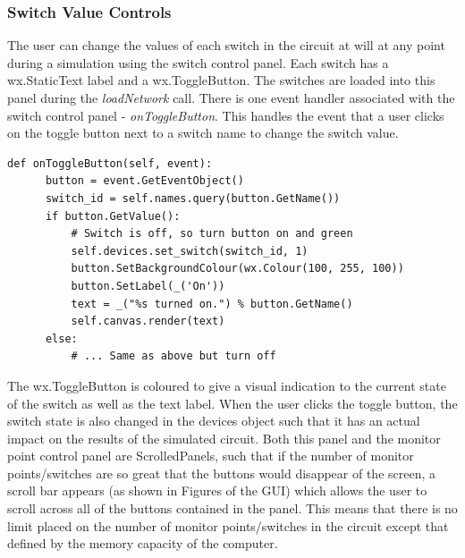 \documentclass{article}					%
\begin{document}
\subsubsection{Switch Value Controls}
The user can change the values of each switch in the circuit at will at any point during a simulation using the switch control panel. Each switch has a wx.StaticText label and a wx.ToggleButton. The switches are loaded into this panel during the \textit{loadNetwork} call. There is one event handler associated with the switch control panel - \textit{onToggleButton}. This handles the event that a user clicks on the toggle button next to a switch name to change the switch value.
\begin{verbatim}
def onToggleButton(self, event):
      button = event.GetEventObject()
      switch_id = self.names.query(button.GetName())
      if button.GetValue():
          # Switch is off, so turn button on and green
          self.devices.set_switch(switch_id, 1)
          button.SetBackgroundColour(wx.Colour(100, 255, 100))
          button.SetLabel(_('On'))
          text = _("%s turned on.") % button.GetName()
          self.canvas.render(text)
      else:
          # ... Same as above but turn off
\end{verbatim}
The wx.ToggleButton is coloured to give a visual indication to the current state of the switch as well as the text label. When the user clicks the toggle button, the switch state is also changed in the devices object such that it has an actual impact on the results of the simulated circuit. Both this panel and the monitor point control panel are ScrolledPanels, such that if the number of monitor points/switches are so great that the buttons would disappear of the screen, a scroll bar appears (as shown in Figures of the GUI) which allows the user to scroll across all of the buttons contained in the panel. This means that there is no limit placed on the number of monitor points/switches in the circuit except that defined by the memory capacity of the computer.
\end{document}
